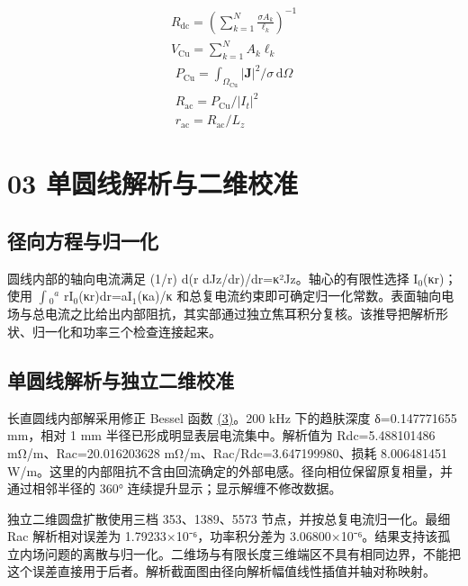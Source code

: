 \documentclass[journal,10pt]{IEEEtran}
\begin{document}
\hypertarget{E01}{}
\begin{equation}
\begin{gathered}
R_{\mathrm{dc}}=\left(\sum_{k=1}^{N}\frac{\sigma A_k}{\ell_k}\right)^{-1} \\
V_{\mathrm{Cu}}=\sum_{k=1}^{N}A_k\ell_k
\end{gathered}
\tag{1}\label{eq:E01}
\end{equation}
\hypertarget{E02}{}
\begin{equation}
\begin{gathered}
P_{\mathrm{Cu}}=\int_{\Omega_{\mathrm{Cu}}}|\mathbf J|^2/\sigma\,\mathrm d\Omega \\
R_{\mathrm{ac}}=P_{\mathrm{Cu}}/|I_t|^2 \\
r_{\mathrm{ac}}=R_{\mathrm{ac}}/L_z
\end{gathered}
\tag{2}\label{eq:E02}
\end{equation}
\FloatBarrier
\section*{03 单圆线解析与二维校准}
\hypertarget{chapter-03}{}
\subsection*{径向方程与归一化}
\hypertarget{03.round_derivation.heading}{}
圆线内部的轴向电流满足 (1/r) d(r dJz/dr)/dr=κ²Jz。轴心的有限性选择 I\(_0\)(κr)；使用 \(\int\)\(_0\)\(^a\) rI\(_0\)(κr)dr=aI\(_1\)(κa)/κ 和总复电流约束即可确定归一化常数。表面轴向电场与总电流之比给出内部阻抗，其实部通过独立焦耳积分复核。该推导把解析形状、归一化和功率三个检查连接起来。


\subsection*{单圆线解析与独立二维校准}
\hypertarget{03.analytic.heading}{}
长直圆线内部解采用修正 Bessel 函数 \href{report_zh-CN_ieee.pdf#E03}{(3)}。200 kHz 下的趋肤深度 δ=0.147771655 mm，相对 1 mm 半径已形成明显表层电流集中。解析值为 Rdc=5.488101486 mΩ/m、Rac=20.016203628 mΩ/m、Rac/Rdc=3.647199980、损耗 8.006481451 W/m。这里的内部阻抗不含由回流确定的外部电感。径向相位保留原复相量，并通过相邻半径的 360° 连续提升显示；显示解缠不修改数据。


独立二维圆盘扩散使用三档 353、1389、5573 节点，并按总复电流归一化。最细 Rac 解析相对误差为 1.79233×10⁻⁶，功率积分差为 3.06800×10⁻⁶。结果支持该孤立内场问题的离散与归一化。二维场与有限长度三维端区不具有相同边界，不能把这个误差直接用于后者。解析截面图由径向解析幅值线性插值并轴对称映射。
\end{document}
